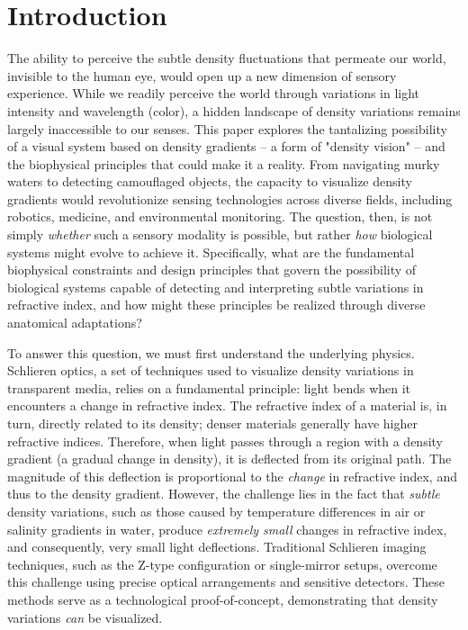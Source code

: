 \documentclass[11pt]{article}
\begin{document}
\newpage

\section{Introduction}

The ability to perceive the subtle density fluctuations that permeate our world, invisible to the human eye, would open up a new dimension of sensory experience. While we readily perceive the world through variations in light intensity and wavelength (color), a hidden landscape of density variations remains largely inaccessible to our senses. This paper explores the tantalizing possibility of a visual system based on density gradients – a form of "density vision" – and the biophysical principles that could make it a reality. From navigating murky waters to detecting camouflaged objects, the capacity to visualize density gradients would revolutionize sensing technologies across diverse fields, including robotics, medicine, and environmental monitoring. The question, then, is not simply \textit{whether} such a sensory modality is possible, but rather \textit{how} biological systems might evolve to achieve it. Specifically, what are the fundamental biophysical constraints and design principles that govern the possibility of biological systems capable of detecting and interpreting subtle variations in refractive index, and how might these principles be realized through diverse anatomical adaptations?

To answer this question, we must first understand the underlying physics. Schlieren optics, a set of techniques used to visualize density variations in transparent media, relies on a fundamental principle: light bends when it encounters a change in refractive index. The refractive index of a material is, in turn, directly related to its density; denser materials generally have higher refractive indices. Therefore, when light passes through a region with a density gradient (a gradual change in density), it is deflected from its original path. The magnitude of this deflection is proportional to the \textit{change} in refractive index, and thus to the density gradient. However, the challenge lies in the fact that \textit{subtle} density variations, such as those caused by temperature differences in air or salinity gradients in water, produce \textit{extremely small} changes in refractive index, and consequently, very small light deflections. Traditional Schlieren imaging techniques, such as the Z-type configuration or single-mirror setups, overcome this challenge using precise optical arrangements and sensitive detectors. These methods serve as a technological proof-of-concept, demonstrating that density variations \textit{can} be visualized.
\end{document}
